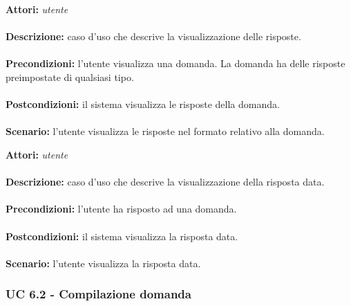 \documentclass[a4paper,11pt]{article}
\begin{document}

\textbf{Attori:} \textit{utente}
\\ \\
\textbf{Descrizione:} caso d'uso che descrive la visualizzazione delle risposte.\\
\\
\textbf{Precondizioni:} l'utente visualizza una domanda. La domanda ha delle risposte preimpostate di qualsiasi tipo.\\
\\
\textbf{Postcondizioni:} il sistema visualizza le risposte della domanda.\\
\\
\textbf{Scenario:} l’utente visualizza le risposte nel formato relativo alla domanda.\\



\textbf{Attori:} \textit{utente}
\\ \\
\textbf{Descrizione:} caso d'uso che descrive la visualizzazione della risposta data.\\
\\
\textbf{Precondizioni:} l'utente ha risposto ad una domanda.\\
\\
\textbf{Postcondizioni:} il sistema visualizza la risposta data.\\
\\
\textbf{Scenario:} l’utente visualizza la risposta data.\\


\newpage
\subsubsection{UC 6.2 - Compilazione domanda}
\end{document}
